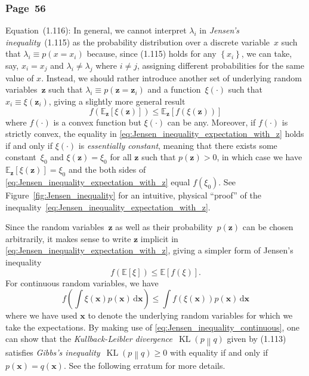 \documentclass[12pt,a4paper]{article}
\newcommand{\erratum}[1]{%
\subsubsection*{#1}
\addcontentsline{toc}{subsection}{#1}}
\begin{document}
\erratum{Page~56}
Equation~(1.116):
In general, we cannot interpret $\lambda_i$ in \emph{Jensen's inequality}~(1.115) as
the probability distribution over a discrete variable~$x$ such that $\lambda_i \equiv p(x = x_i)$
because, since (1.115) holds for any $\left\{x_i\right\}$,
we can take, say, $x_i = x_j$ and $\lambda_i \neq \lambda_j$ where $i \neq j$,
assigning different probabilities for the same value of $x$.
Instead, we should rather introduce another set of underlying random variables~$\mathbf{z}$
such that $\lambda_i \equiv p(\mathbf{z} = \mathbf{z}_i)$ and
a function~$\xi(\cdot)$ such that $x_i \equiv \xi(\mathbf{z}_i)$,
giving a slightly more general result
\begin{equation}
f\left(\mathbb{E}_{\mathbf{z}}\left[\xi(\mathbf{z})\right]\right)
\leqslant \mathbb{E}_{\mathbf{z}}\left[f\left(\xi(\mathbf{z})\right)\right]
\label{eq:Jensen_inequality_expectation_with_z}
\end{equation}
where $f(\cdot)$ is a convex function but $\xi(\cdot)$ can be any.
Moreover, if $f(\cdot)$ is strictly convex,
the equality in \eqref{eq:Jensen_inequality_expectation_with_z} holds if and only if
$\xi(\cdot)$ is \emph{essentially constant},
meaning that there exists some constant~$\xi_0$ and
$\xi(\mathbf{z}) = \xi_0$ for all $\mathbf{z}$ such that $p(\mathbf{z}) > 0$,
in which case we have $\mathbb{E}_{\mathbf{z}}\left[\xi(\mathbf{z})\right] = \xi_0$
and the both sides of \eqref{eq:Jensen_inequality_expectation_with_z} equal $f(\xi_0)$.
See Figure~\ref{fig:Jensen_inequality} for an intuitive, physical ``proof'' of
the inequality~\eqref{eq:Jensen_inequality_expectation_with_z}.

Since the random variables~$\mathbf{z}$ as well as their probability~$p(\mathbf{z})$ can be chosen
arbitrarily,
it makes sense to write $\mathbf{z}$ implicit in \eqref{eq:Jensen_inequality_expectation_with_z},
giving a simpler form of Jensen's inequality
\begin{equation}
f\left(\mathbb{E}\left[\xi\right]\right)
\leqslant \mathbb{E}\left[f\left(\xi\right)\right] .
\label{eq:Jensen_inequality_expectation}
\end{equation}
For continuous random variables, we have
\begin{equation}
f\left(\int\xi(\mathbf{x}) p(\mathbf{x}) \,\mathrm{d}\mathbf{x}\right) \leqslant 
\int f\left(\xi(\mathbf{x})\right) p(\mathbf{x}) \,\mathrm{d}\mathbf{x}
\label{eq:Jensen_inequality_continuous}
\end{equation}
where we have used $\mathbf{x}$ to denote the underlying random variables
for which we take the expectations.
By making use of \eqref{eq:Jensen_inequality_continuous},
one can show that
the \emph{Kullback-Leibler divergence}~$\operatorname{KL}\left( p \middle\| q \right)$
given by (1.113) satisfies
\emph{Gibbs's inequality}~$\operatorname{KL}\left( p \middle\| q \right) \geqslant 0$
with equality if and only if $p(\mathbf{x}) = q(\mathbf{x})$.
See the following erratum for more details.
\end{document}
